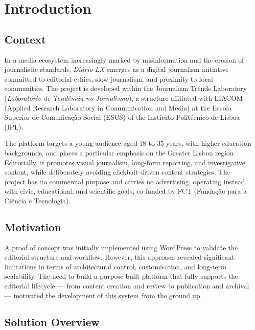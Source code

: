 %
%
\chapter{Introduction} \label{cap:intro}

\section{Context} \label{sec:intro_context}

In a media ecosystem increasingly marked by misinformation and the erosion of journalistic standards, \textit{Diário LX} emerges as a digital journalism initiative committed to editorial ethics, slow journalism, and proximity to local communities. The project is developed within the Journalism Trends Laboratory (\textit{Laboratório de Tendência no Jornalismo}), a structure affiliated with LIACOM (Applied Research Laboratory in Communication and Media) at the Escola Superior de Comunicação Social (ESCS) of the Instituto Politécnico de Lisboa (IPL).

The platform targets a young audience aged 18 to 35 years, with higher education backgrounds, and places a particular emphasis on the Greater Lisbon region. Editorially, it promotes visual journalism, long-form reporting, and investigative content, while deliberately avoiding clickbait-driven content strategies. The project has no commercial purpose and carries no advertising, operating instead with civic, educational, and scientific goals, co-funded by FCT (Fundação para a Ciência e Tecnologia).

\section{Motivation} \label{sec:intro_motivation}

A proof of concept was initially implemented using WordPress to validate the editorial structure and workflow. However, this approach revealed significant limitations in terms of architectural control, customisation, and long-term scalability. The need to build a purpose-built platform that fully supports the editorial lifecycle — from content creation and review to publication and archival — motivated the development of this system from the ground up.

\section{Solution Overview} \label{sec:intro_solution}

